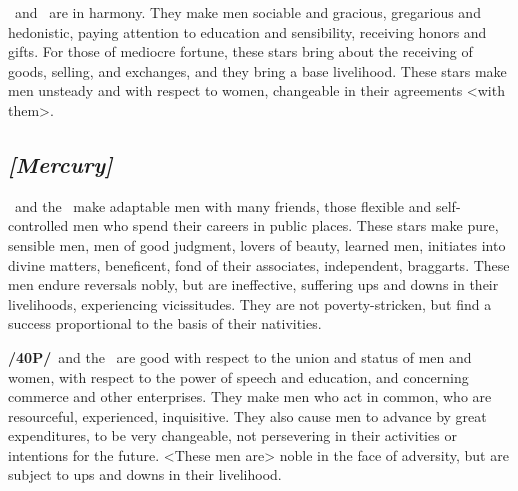 \Venus\, and \Mercury\, are in harmony. They make men sociable and gracious, gregarious and hedonistic, paying attention to education and sensibility, receiving honors and gifts. For those of mediocre fortune, these stars bring about the receiving of goods, selling, and exchanges, and they bring a base livelihood. These stars make men unsteady and  with respect to women, changeable in their agreements <with them>.

\secbr
{}
\subsection{\textit{[Mercury]}}
\Mercury\, and the \Sun\, make adaptable men with many friends, those flexible and self-controlled men who spend their careers in public places. These stars make pure, sensible men, men of good judgment, lovers of beauty, learned men, initiates into divine matters, beneficent, fond of their associates, independent, braggarts. These men endure reversals nobly, but are ineffective, suffering ups and downs in their livelihoods, experiencing vicissitudes. They are not poverty-stricken, but find a success proportional to the basis of their nativities.

\textbf{/40P/}\Mercury\, and the \Moon\, are good with respect to the union and status of men and women, with respect to the power of speech and education, and concerning commerce and other enterprises. They make men who act in common, who are resourceful, experienced, inquisitive. They also cause men to advance by great expenditures, to be very changeable, not persevering in their activities or intentions for the future. <These men are> noble in the face of adversity, but are subject to ups and downs in their livelihood.

